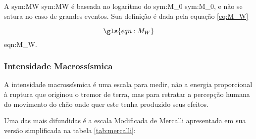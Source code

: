 A \glsdesc{sym:MW} \gls{sym:MW} \citep{hanks_1979} é baseada no 
logarítmo do \glsdesc{sym:M_0} \gls{sym:M_0}, e não se satura no caso de grandes eventos. 
Sua definição é dada pela equação \eqref{eq:M_W} 

\begin{equation}
	\gls{eqn:M_W}
	\label{eq:M_W}
\end{equation}
\glsdesc*{eqn:M_W}.


\subsubsection{Intensidade Macrossísmica}
\label{sec:intensidade}

A intensidade macrossísmica é uma escala para medir, não a energia proporcional
à ruptura que originou o tremor de terra, mas para retratar a percepção humana do
movimento do chão onde quer este tenha produzido seus efeitos.

Uma das mais difundidas é a escala Modificada de Mercalli \citep{richter_1958} apresentada em sua versão simplificada 
na tabela \ref{tab:mercalli}:


